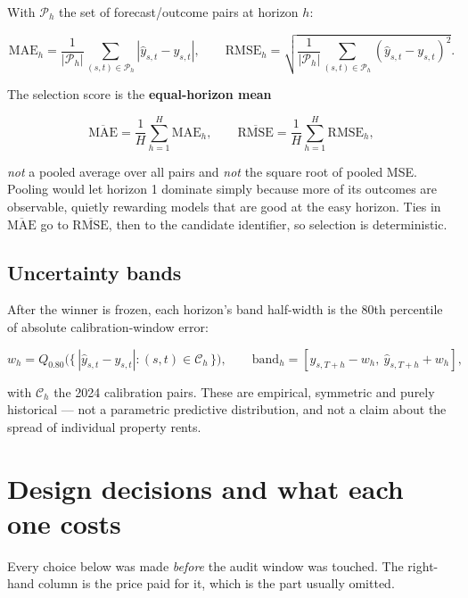 \documentclass[11pt,a4paper]{article}
\begin{document}
With \(\mathcal{P}_h\) the set of forecast/outcome pairs at horizon \(h\):

\[
\mathrm{MAE}_h = \frac{1}{|\mathcal{P}_h|}\sum_{(s,t)\in\mathcal{P}_h}\left|\hat{y}_{s,t}-y_{s,t}\right|,
\qquad
\mathrm{RMSE}_h = \sqrt{\frac{1}{|\mathcal{P}_h|}\sum_{(s,t)\in\mathcal{P}_h}\left(\hat{y}_{s,t}-y_{s,t}\right)^{2}} .
\]

The selection score is the \textbf{equal-horizon mean}

\[
\overline{\mathrm{MAE}} = \frac{1}{H}\sum_{h=1}^{H}\mathrm{MAE}_h ,
\qquad
\overline{\mathrm{RMSE}} = \frac{1}{H}\sum_{h=1}^{H}\mathrm{RMSE}_h ,
\]

\emph{not} a pooled average over all pairs and \emph{not} the square root of pooled MSE. Pooling would let horizon 1 dominate simply because more of its outcomes are observable, quietly rewarding models that are good at the easy horizon. Ties in \(\overline{\mathrm{MAE}}\) go to \(\overline{\mathrm{RMSE}}\), then to the candidate identifier, so selection is deterministic.

\subsection{Uncertainty bands}

After the winner is frozen, each horizon's band half-width is the 80th percentile of absolute calibration-window error:

\[
w_h = Q_{0.80}\Big(\big\{\,|\hat{y}_{s,t}-y_{s,t}| : (s,t)\in\mathcal{C}_h\,\big\}\Big),
\qquad
\text{band}_h = \left[\hat{y}_{s,T+h}-w_h,\ \hat{y}_{s,T+h}+w_h\right],
\]

with \(\mathcal{C}_h\) the 2024 calibration pairs. These are empirical, symmetric and purely historical --- not a parametric predictive distribution, and not a claim about the spread of individual property rents.

\section{Design decisions and what each one costs}

Every choice below was made \emph{before} the audit window was touched. The right-hand column is the price paid for it, which is the part usually omitted.
\end{document}
